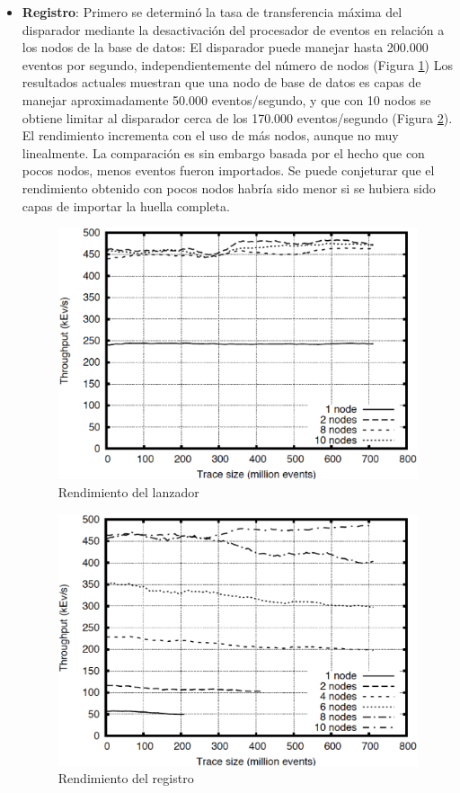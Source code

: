 \documentclass[12pt,legalpaper]{report}
\begin{document}
\begin{itemize}
	\item \textbf{Registro}: Primero se determinó la tasa de transferencia máxima del disparador mediante la desactivación del procesador de eventos en relación a los nodos de la base de datos:  El disparador puede manejar hasta 200.000 eventos por segundo, independientemente del número de nodos (Figura \ref{BenchDispatch})  Los resultados actuales muestran que una nodo de base de datos es capas de manejar aproximadamente 50.000 eventos/segundo, y que con 10 nodos se obtiene limitar al disparador cerca de los 170.000 eventos/segundo (Figura \ref{DB}).  El rendimiento incrementa con el uso de más nodos, aunque no muy linealmente.  La comparación es sin embargo basada por el hecho que con pocos nodos, menos eventos fueron importados.  Se puede conjeturar que el rendimiento obtenido con pocos nodos habría sido menor si se hubiera sido capas de importar la huella completa.

\begin{figure}[h]
	\centering
	\includegraphics[scale=0.3]{images/TOD/BenchDispatch.eps}
	\caption{Rendimiento del lanzador}
	\label{BenchDispatch}
\end{figure}		

\begin{figure}[h]
	\centering
	\includegraphics[scale=0.3]{images/TOD/BenchDBThroughput.eps}
	\caption{Rendimiento del registro}
	\label{DB}
\end{figure}


\end{itemize}
\end{document}
